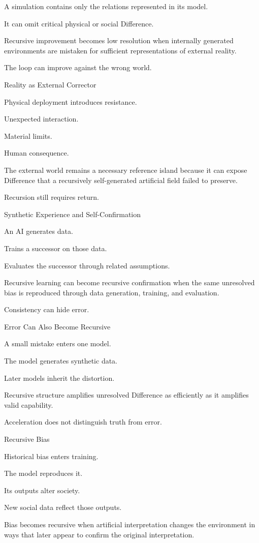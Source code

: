 A simulation contains only the relations represented in its model.

It can omit critical physical or social Difference.

Recursive improvement becomes low resolution when internally generated environments are mistaken for sufficient representations of external reality.

The loop can improve against the wrong world.

Reality as External Corrector

Physical deployment introduces resistance.

Unexpected interaction.

Material limits.

Human consequence.

The external world remains a necessary reference island because it can expose Difference that a recursively self-generated artificial field failed to preserve.

Recursion still requires return.

Synthetic Experience and Self-Confirmation

An AI generates data.

Trains a successor on those data.

Evaluates the successor through related assumptions.

Recursive learning can become recursive confirmation when the same unresolved bias is reproduced through data generation, training, and evaluation.

Consistency can hide error.

Error Can Also Become Recursive

A small mistake enters one model.

The model generates synthetic data.

Later models inherit the distortion.

Recursive structure amplifies unresolved Difference as efficiently as it amplifies valid capability.

Acceleration does not distinguish truth from error.

Recursive Bias

Historical bias enters training.

The model reproduces it.

Its outputs alter society.

New social data reflect those outputs.

Bias becomes recursive when artificial interpretation changes the environment in ways that later appear to confirm the original interpretation.

